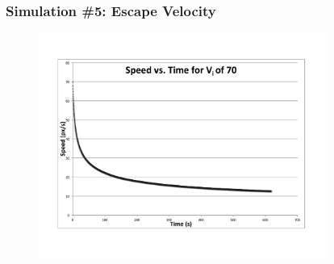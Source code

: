 \documentclass{beamer}
\begin{document}
\begin{frame}
\frametitle{Simulation \#5: Escape Velocity}

\begin{figure}[h] 
	\centering
		\includegraphics[width=9.5cm]{fig3.pdf}

	\label{fig:data1}
\end{figure}
\end{frame}






















































\end{document}
